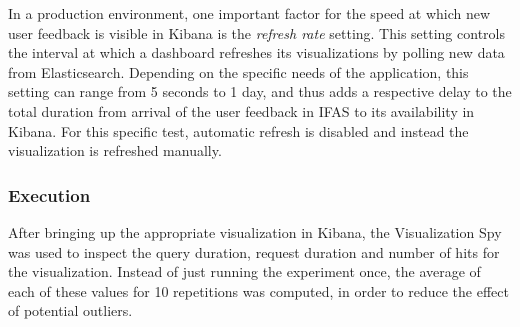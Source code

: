 In a production environment, one important factor for the speed at which new user feedback is visible in Kibana is the \emph{refresh rate} setting.
This setting controls the interval at which a dashboard refreshes its visualizations by polling new data from Elasticsearch.
Depending on the specific needs of the application, this setting can range from 5 seconds to 1 day, and thus adds a respective delay to the total duration from arrival of the user feedback in \ac{IFAS} to its availability in Kibana.
For this specific test, automatic refresh is disabled and instead the visualization is refreshed manually.

%

\subsubsection{Execution}

After bringing up the appropriate visualization in Kibana, the Visualization Spy was used to inspect the query duration, request duration and number of hits for the visualization.
Instead of just running the experiment once, the average of each of these values for 10 repetitions was computed, in order to reduce the effect of potential outliers.

